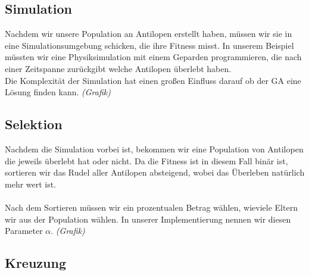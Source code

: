         \subsection{Simulation}
            Nachdem wir unsere Population an Antilopen erstellt haben, müssen wir sie in eine Simulationsumgebung schicken, die ihre Fitness misst. In unserem Beispiel müssten wir eine Physiksimulation mit einem Geparden programmieren, die nach einer Zeitspanne zurückgibt welche Antilopen überlebt haben. \\
            \noindent
            Die Komplexität der Simulation hat einen großen Einfluss darauf ob der GA eine Lösung finden kann. \textit{(Grafik)}


        \subsection{Selektion}

            Nachdem die Simulation vorbei ist, bekommen wir eine Population von Antilopen die jeweils überlebt hat oder nicht. Da die Fitness ist in diesem Fall binär ist, sortieren wir das Rudel aller Antilopen absteigend, wobei das Überleben natürlich mehr wert ist.\\
            \\
            Nach dem Sortieren müssen wir ein prozentualen Betrag wählen, wieviele Eltern wir aus der Population wählen. In unserer Implementierung nennen wir diesen Parameter $\alpha$. \textit{(Grafik)}

        \subsection{Kreuzung}
            
